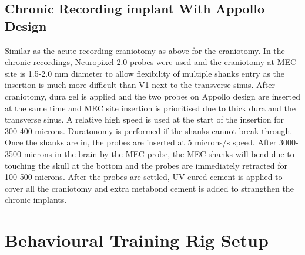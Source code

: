 \subsection{Chronic Recording implant With Appollo Design}
Similar as the acute recording craniotomy as above for the craniotomy. In the chronic recordings, Neuropixel 2.0 probes were used and the craniotomy at MEC site is 1.5-2.0 mm diameter to allow flexibility of  multiple shanks entry as the insertion is much more difficult than V1 next to the transverse sinus. After craniotomy, dura gel is applied and the two probes on Appollo design are inserted at the same time and MEC site insertion is prioritised due to thick dura and the transverse sinus. A relative high speed is used at the start of the insertion for 300-400 microns. Duratonomy is performed if the shanks cannot break through. Once the shanks are in, the probes are inserted at 5 microns/s speed. After 3000-3500 microns in the brain by the MEC probe, the MEC shanks will bend due to touching the skull at the bottom and the probes are immediately retracted for 100-500 microns. After the probes are settled, UV-cured cement is applied to cover all the craniotomy and extra metabond cement is added to strangthen the chronic implants.



\section{Behavioural Training Rig Setup}
